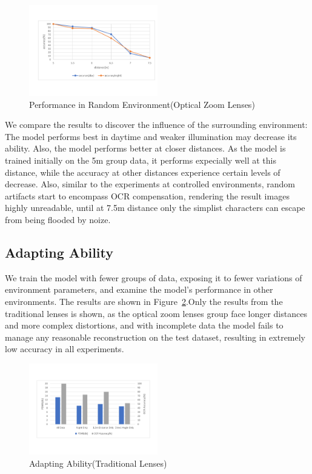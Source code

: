 \begin{figure}
 \centering
    \includegraphics[width=0.5\textwidth]{./pic/distance2.pdf}
    \caption{Performance in Random Environment(Optical Zoom Lenses)}
    \label{fig-random2}
\end{figure}
We compare the results to discover the influence of the surrounding environment: The model performs best in daytime and weaker illumination may decrease its ability. Also, the model performs better at closer distances. As the model is trained initially on the 5m group data, it performs expecially well at this distance, while the accuracy at other distances experience certain levels of decrease. Also, similar to the experiments at controlled environments, random artifacts start to encompass OCR compensation, rendering the result images highly unreadable, until at 7.5m distance only the simplist characters can escape from being flooded by noize.

\subsection{Adapting Ability}
We train the model with fewer groups of data, exposing it to fewer variations of environment parameters, and examine the model’s performance in other environments. The results are shown in Figure~\ref{table-adapt}.Only the results from the traditional lenses is shown, as the optical zoom lenses group face longer distances and more complex distortions, and with incomplete data the model fails to manage any reasonable reconstruction on the test dataset, resulting in extremely low accuracy in all experiments.

\begin{figure}
 \centering
    \includegraphics[width=0.5\textwidth]{./pic/table3.pdf}
    \caption{Adapting Ability(Traditional Lenses)}
    \label{table-adapt}
\end{figure}

